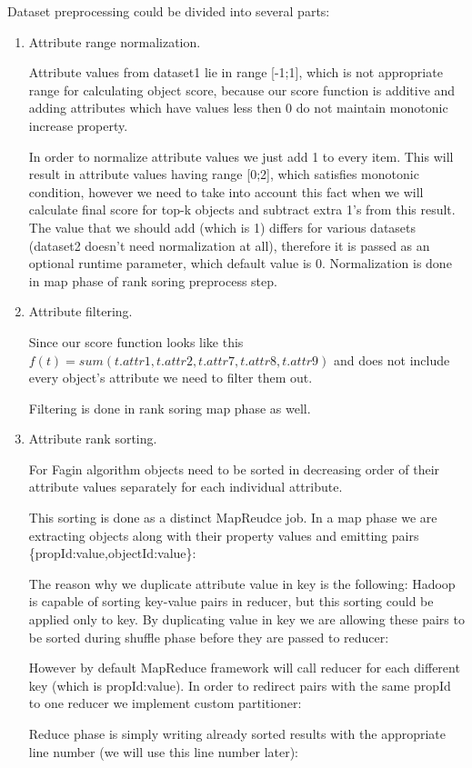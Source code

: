 \documentclass[a4paper]{article}
\begin{document}
Dataset preprocessing could be divided into several parts:
\begin{enumerate}
	\item Attribute range normalization.

		Attribute values from dataset1 lie in range [-1;1], which is not appropriate range for calculating object score, because our score function is additive and adding attributes which have values less then 0 do not maintain monotonic increase property.
		
		In order to normalize attribute values we just add 1 to every item.
		This will result in attribute values having range [0;2], which satisfies monotonic condition, however we need to take into account this fact when we will calculate final score for top-k objects and subtract extra 1's from this result. The value that we should add (which is 1) differs for various datasets (dataset2 doesn't need normalization at all), therefore it is passed as an optional runtime parameter, which default value is 0.  
		Normalization is done in map phase of rank soring preprocess step.
	\item Attribute filtering.

		Since our score function looks like this $f(t) = sum( t.attr1, t.attr2, t.attr7, t.attr8, t.attr9)$ and does not include every object's attribute we need to filter them out.

		Filtering is done in rank soring map phase as well.
 	\item Attribute rank sorting.

 		For Fagin algorithm objects need to be sorted in decreasing order of their attribute values separately for each individual attribute.

 		This sorting is done as a distinct MapReudce job. 
 		In a map phase we are extracting objects along with their property values and emitting pairs \{propId:value,objectId:value\}:    
 		
 		
 		The reason why we duplicate attribute value in key is the following: Hadoop is capable of sorting key-value pairs in reducer, but this sorting could be applied only to key. By duplicating value in key we are allowing these pairs to be sorted during shuffle phase before they are passed to reducer:
		
 		
 		However by default MapReduce framework will call reducer for each different key (which is propId:value). In order to redirect pairs with the same propId to one reducer we implement custom partitioner:
 		

 		Reduce phase is simply writing already sorted results with the appropriate line number (we will use this line number later): 
 		
\end{enumerate}
\end{document}
